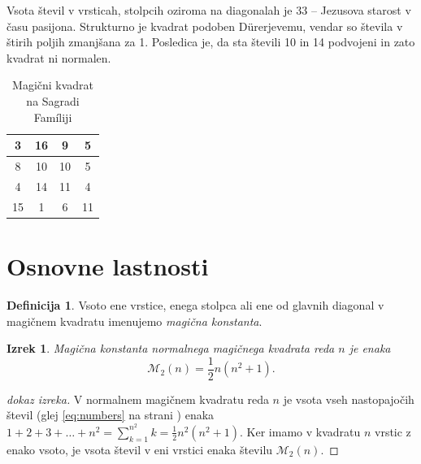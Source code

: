 \documentclass[a4paper,12pt]{article}
\newcommand{\pojem}[1]{\emph{\color{purple}#1}}
\newenvironment{magic}[3]{\begin{table}[!ht]
   \centering
   \caption{#1}
   \label{#2}
   \large
   \begin{tabular}{|*{#3}{c|}}
   \hline}{ \end{tabular}
   \normalsize
\end{table}}
\newcommand{\m}{\mathcal{M}_2}
\theoremstyle{definition}
\newtheorem{definicija}{Definicija}
\theoremstyle{plain}
\newtheorem{izrek}{Izrek}
\begin{document}
Vsota števil v vrsticah, stolpcih oziroma na diagonalah je 33 -- Jezusova starost
v času pasijona. Strukturno je kvadrat podoben Dürerjevemu, vendar so števila
v štirih poljih zmanjšana za 1. Posledica je, da sta števili 10 in 14 podvojeni
in zato kvadrat ni normalen.
%
\begin{magic}{Magični kvadrat na Sagradi Famíliji}{table:sagrada}{4}
   3 & 16 &  9 &  5 \\\hline
   8 & 10 & 10 &  5 \\\hline
   4 & 14 & 11 &  4 \\\hline
   15 & 1 & 6 & 11 \\\hline
\end{magic}


\section{Osnovne lastnosti}

\begin{definicija}
   Vsoto ene vrstice, enega stolpca ali ene od glavnih diagonal
   v magičnem kvadratu imenujemo \pojem{\color{purple}magična konstanta}.
\end{definicija}

\begin{izrek}
   Magična konstanta normalnega magičnega kvadrata reda \(n\)
   je enaka
   \begin{equation}
      \label{eq:mc}
      \m(n) = \frac{1}{2} n(n^2+1).
   \end{equation}
\end{izrek}

\begin{proof}[dokaz izreka]
   V normalnem magičnem kvadratu reda \(n\) je vsota vseh nastopajočih
   števil (glej \eqref{eq:numbers} na strani \pageref{eq:numbers}) enaka
   \(1+2+3+\ldots+n^2=\sum_{k=1}^{n^2}k=\frac{1}{2}n^2(n^2+1)\). Ker imamo
   v kvadratu \(n\) vrstic z enako vsoto, je vsota števil v eni vrstici
   enaka številu \(\m(n)\).
\end{proof}
\end{document}
